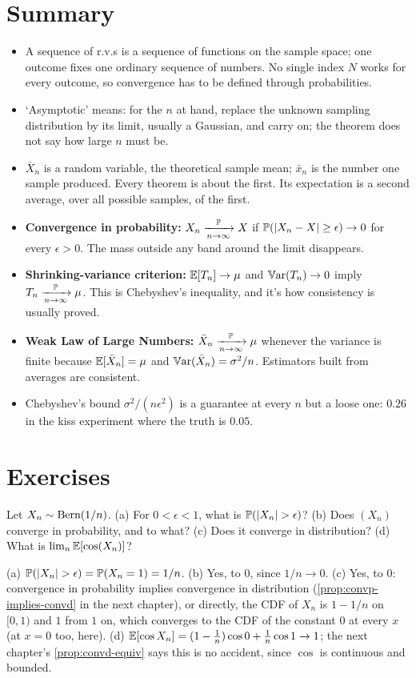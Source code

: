 \section{Summary}
\label{sec:lln-summary}

\begin{itemize}[nosep]
\item A sequence of r.v.s is a sequence of functions on the sample space; one outcome fixes one ordinary sequence of numbers. No single index $N$ works for every outcome, so convergence has to be defined through probabilities.
\item `Asymptotic' means: for the $n$ at hand, replace the unknown sampling distribution by its limit, usually a Gaussian, and carry on; the theorem does not say how large $n$ must be.
\item $\bar{X}_n$ is a random variable, the theoretical sample mean; $\bar{x}_n$ is the number one sample produced. Every theorem is about the first. Its expectation is a second average, over all possible samples, of the first.
\item \textbf{Convergence in probability:} $X_n \xrightarrow [n \to \infty ]{\mathbb{P}} X$ if $\mathbb{P}(\lvert X_n - X\rvert \geq \epsilon) \to 0$ for every $\epsilon > 0$. The mass outside any band around the limit disappears.
\item \textbf{Shrinking-variance criterion:} $\operatorname*{\mathbb{E}}[T_n] \to \mu$ and $\operatorname*{\mathbb{V}\text{ar}}(T_n) \to 0$ imply $T_n \xrightarrow [n \to \infty ]{\mathbb{P}} \mu$. This is Chebyshev's inequality, and it's how consistency is usually proved.
\item \textbf{Weak Law of Large Numbers:} $\bar{X}_n \xrightarrow [n \to \infty ]{\mathbb{P}} \mu$ whenever the variance is finite because $\operatorname*{\mathbb{E}}[\bar{X}_n] = \mu$ and $\operatorname*{\mathbb{V}\text{ar}}(\bar{X}_n) = \sigma^2/n$. Estimators built from averages are consistent.
\item Chebyshev's bound $\sigma^2/(n\epsilon^2)$ is a guarantee at every $n$ but a loose one: $0.26$ in the kiss experiment where the truth is $0.05$.
\end{itemize}

\section{Exercises}
\label{sec:lln-exercises}

\begin{exercise}
Let $X_n \sim \text{Bern}(1/n)$. (a) For $0 < \epsilon < 1$, what is $\mathbb{P}(\lvert X_n\rvert > \epsilon)$? (b) Does $(X_n)$ converge in probability, and to what? (c) Does it converge in distribution? (d) What is $\lim_n \operatorname*{\mathbb{E}}[\cos(X_n)]$?
\end{exercise}
\begin{solution}
(a) $\mathbb{P}(\lvert X_n\rvert > \epsilon) = \mathbb{P}(X_n = 1) = 1/n$. (b) Yes, to $0$, since $1/n \to 0$. (c) Yes, to $0$: convergence in probability implies convergence in distribution (\cref{prop:convp-implies-convd} in the next chapter), or directly, the CDF of $X_n$ is $1 - 1/n$ on $[0, 1)$ and $1$ from $1$ on, which converges to the CDF of the constant $0$ at every $x$ (at $x = 0$ too, here). (d) $\operatorname*{\mathbb{E}}[\cos X_n] = (1 - \frac1n)\cos 0 + \frac1n \cos 1 \to 1$; the next chapter's \cref{prop:convd-equiv} says this is no accident, since $\cos$ is continuous and bounded.
\end{solution}

